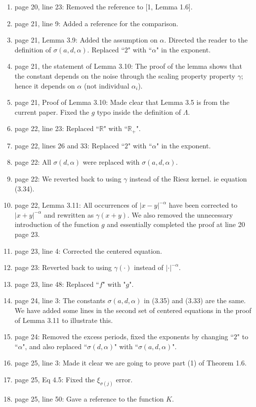 \documentclass[12pt]{article}%
\theoremstyle{plain}
\theoremstyle{definition}
\def\R{\mathbb{R}}
\newcommand{\Norm}[1]{\left|\left|  #1   \right|\right|}
\numberwithin{equation}{section}
\begin{document}
\begin{enumerate}
    $\Norm{\cdot}_{q,w}$.
  \item[35.] page 20, line 23: Removed the reference to [1, Lemma 1.6].
  \item[36.] page 21, line 9: Added a reference for the comparison.
  \item[37.] page 21, Lemma 3.9: Added the assumption on $\alpha$. Directed the
    reader to the definition of $\sigma(a,d,\alpha)$. Replaced ``$2$" with
    ``$\alpha$" in the exponent.
  \item[38.] page 21, the statement of Lemma 3.10: The proof of the lemma shows
    that the constant depends on the noise through the scaling property
    property $\gamma$; hence it depends on $\alpha$ (not individual
    $\alpha_i$).
  \item[39.] page 21, Proof of Lemma 3.10: Made clear that Lemma 3.5 is from
    the current paper. Fixed the $g$ typo inside the definition of $\Lambda$.
  \item[40.] page 22, line 23: Replaced ``$\R$" with ``$\R_+$".
  \item[41.] page 22, lines 26 and 33: Replaced ``$2$" with ``$\alpha$" in the
    exponent.
  \item[42.] page 22: All $\sigma(d,\alpha)$ were replaced with
    $\sigma(a,d,\alpha)$.
  \item[43.] page 22: We reverted back to using $\gamma$ instead of the Riesz
    kernel. ie equation (3.34).
  \item[44.] page 22, Lemma 3.11: All occurrences of $|x-y|^{-\alpha}$ have
    been corrected to $|x+y|^{-\alpha}$ and rewritten as $\gamma(x+y)$. We also
    removed the unnecessary introduction of the function $g$ and essentially
    completed the proof at line 20 page 23.

  \item[45.] page 23, line 4: Corrected the centered equation.
  \item[46.] page 23: Reverted back to using $\gamma(\cdot)$ instead of
    $|\cdot|^{-\alpha}$.
  \item[47.] page 23, line 48: Replaced ``$f$" with "$g$".
  \item[48.] page 24, line 3: The constants $\sigma(a, d, \alpha)$ in (3.35)
    and (3.33) are the same. We have added some lines in the second set of
    centered equations in the proof of Lemma 3.11 to illustrate this.

  \item[49.] page 24: Removed the excess periods, fixed the exponents by
    changing ``$2$" to ``$\alpha$", and also replaced ``$\sigma(d,\alpha)$"
    with ``$\sigma(a,d,\alpha)$".
  \item[50.] page 25, line 3: Made it clear we are going to prove part (1) of
    Theorem 1.6.
  \item[51.] page 25, Eq 4.5: Fixed the $\xi_{\sigma(j)}$ error.
  \item[52.] page 25, line 50: Gave a reference to the function $K$.


\end{enumerate}
\end{document}
